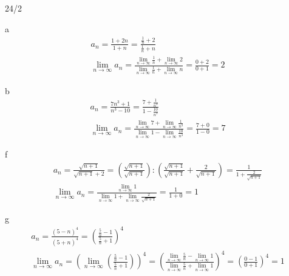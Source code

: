 \newpage
\begin{exercise}{24/2}
  \item [a]
  \begin{gather*}
    a_n = \frac{1 + 2n}{1 + n} = \frac{\frac{1}{n} + 2}{\frac{1}{n} + n} \\
    \lim\limits_{n \to \infty} a_n = \frac{\lim\limits_{n \to \infty} \frac{1}{n} + \lim\limits_{n \to \infty} 2}{\lim\limits_{n \to \infty} \frac{1}{n} + \lim\limits_{n \to \infty} n} = \frac{0 + 2}{0 + 1} = 2
  \end{gather*}
  \item [b]
  \begin{gather*}
    a_n = \frac{7n^3 + 1}{n^3 - 10} = \frac{7 + \frac{1}{n^3}}{1 - \frac{10}{n^3}} \\
    \lim\limits_{n \to \infty} a_n = \frac{\lim\limits_{n \to \infty} 7 + \lim\limits_{n \to \infty} \frac{1}{n^3}}{\lim\limits_{n \to \infty} 1 - \lim\limits_{n \to \infty} \frac{10}{n^3}} = \frac{7 + 0}{1 - 0} = 7
  \end{gather*}
  \item [f]
  \begin{gather*}
    a_n = \frac{\sqrt{n + 1}}{\sqrt{n + 1} + 2} = (\frac{\sqrt{n + 1}}{\sqrt{n + 1}}) : (\frac{\sqrt{n + 1}}{\sqrt{n + 1}} + \frac{2}{\sqrt{n + 1}}) = \frac{1}{1 + \frac{2}{\sqrt{n + 1}}} \\
    \lim\limits_{n \to \infty} a_n = \frac{\lim\limits_{n \to \infty} 1}{\lim\limits_{n \to \infty} 1 + \lim\limits_{n \to \infty} \frac{2}{\sqrt{n + 1}}} = \frac{1}{1 + 0} = 1
  \end{gather*}
  \item [g]
  \begin{gather*}
    a_n = \frac{(5 - n)^4}{(5 + n)^4} = (\frac{\frac{5}{n} - 1}{\frac{5}{n} + 1})^4 \\
    \lim\limits_{n \to \infty} a_n = (\lim\limits_{n \to \infty} (\frac{\frac{5}{n} - 1}{\frac{5}{n} + 1}))^4 = (\frac{\lim\limits_{n \to \infty} \frac{5}{n} - \lim\limits_{n \to \infty} 1}{\lim\limits_{n \to \infty} \frac{5}{n} + \lim\limits_{n \to \infty} 1})^4 = (\frac{0 - 1}{0 + 1})^4 = 1
  \end{gather*}
\end{exercise}
\newpage
